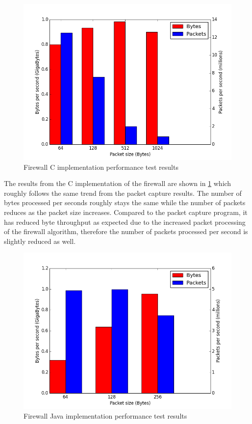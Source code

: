 \documentclass[final_report.tex]{subfiles}
\begin{document}
\begin{figure}[H]
	\centering
	\includegraphics[width=\textwidth]{../../data/firewall/c.png}
	\caption{Firewall C implementation performance test results}
	\label{fig:firec}
\end{figure}

The results from the C implementation of the firewall are shown in \ref{fig:firec} which roughly follows the same trend from the packet capture results. The number of bytes processed per seconds roughly stays the same while the number of packets reduces as the packet size increases. Compared to the packet capture program, it has reduced byte throughput as expected due to the increased packet processing of the firewall algorithm, therefore the number of packets processed per second is slightly reduced as well.

\begin{figure}[H]
	\centering
	\includegraphics[width=\textwidth]{../../data/firewall/java.png}
	\caption{Firewall Java implementation performance test results}
	\label{fig:firejava}
\end{figure}
\end{document}
